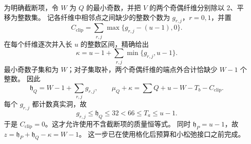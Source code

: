 为明确截断项，令 $W$ 为 $Q$ 的最小奇数，并把 $V$ 的两个奇偶纤维分别除以 2、平移为整数集。
记各纤维中相邻点之间缺少的整数个数为 $g_{r,j}$，$r=0,1$，并置
\[
 C_{\mathrm{clip}}=\sum_{r,j}\max\{g_{r,j}-(u-1),0\}.
\]
在每个纤维逐次并入长 $u$ 的整数区间，精确给出
\[
 \kappa=u-1+\sum_{r,j}\min\{g_{r,j},u-1\}.
\]
最小奇数子集和为 $W$；对子集取补，两个奇偶纤维的端点外合计恰缺少 $W-1$ 个整数。
因此
\[
 \mathfrak h_Q=W-1+\sum_{r,j}g_{r,j},\qquad
 \mu_Q+\kappa=\sum Q+u-W-T_b-C_{\mathrm{clip}}. \tag{R4}
\]
每个 $g_{r,j}$ 都计数真实洞，故
\[
 g_{r,j}\le\mathfrak h_Q\le32<66\le T_a\le u-1.
\]
于是 $C_{\mathrm{clip}}=0$。这才允许使用不含截断项的质量恒等式。
同时 $\mathfrak h_P=u-1$，故 $z=\mathfrak h_P+\mathfrak h_Q-\kappa=W-1$。
这一步已在使用格化后预算和小松弛接口之前完成。

